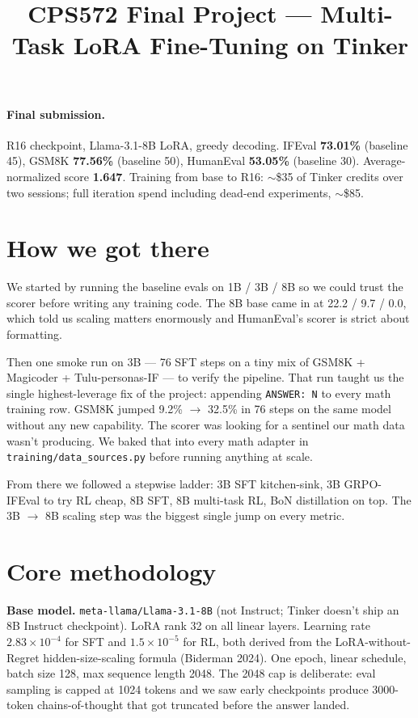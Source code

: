 \documentclass[11pt]{article}
\title{\vspace{-2em}CPS572 Final Project --- Multi-Task LoRA Fine-Tuning on Tinker}
\author{}
\date{}
\begin{document}
\maketitle
\vspace{-3em}

\paragraph{Final submission.} R16 checkpoint, Llama-3.1-8B LoRA, greedy decoding. IFEval \textbf{73.01\%} (baseline 45), GSM8K \textbf{77.56\%} (baseline 50), HumanEval \textbf{53.05\%} (baseline 30). Average-normalized score \textbf{1.647}. Training from base to R16: $\sim$\$35 of Tinker credits over two sessions; full iteration spend including dead-end experiments, $\sim$\$85.

\section{How we got there}

We started by running the baseline evals on 1B / 3B / 8B so we could trust the scorer before writing any training code. The 8B base came in at 22.2 / 9.7 / 0.0, which told us scaling matters enormously and HumanEval's scorer is strict about formatting.

Then one smoke run on 3B --- 76 SFT steps on a tiny mix of GSM8K + Magicoder + Tulu-personas-IF --- to verify the pipeline. That run taught us the single highest-leverage fix of the project: appending \texttt{ANSWER: N} to every math training row. GSM8K jumped 9.2\% $\rightarrow$ 32.5\% in 76 steps on the same model without any new capability. The scorer was looking for a sentinel our math data wasn't producing. We baked that into every math adapter in \texttt{training/data\_sources.py} before running anything at scale.

From there we followed a stepwise ladder: 3B SFT kitchen-sink, 3B GRPO-IFEval to try RL cheap, 8B SFT, 8B multi-task RL, BoN distillation on top. The 3B $\rightarrow$ 8B scaling step was the biggest single jump on every metric.

\section{Core methodology}

\textbf{Base model.} \texttt{meta-llama/Llama-3.1-8B} (not Instruct; Tinker doesn't ship an 8B Instruct checkpoint). LoRA rank 32 on all linear layers. Learning rate $2.83 \times 10^{-4}$ for SFT and $1.5 \times 10^{-5}$ for RL, both derived from the LoRA-without-Regret hidden-size-scaling formula (Biderman 2024). One epoch, linear schedule, batch size 128, max sequence length 2048. The 2048 cap is deliberate: eval sampling is capped at 1024 tokens and we saw early checkpoints produce 3000-token chains-of-thought that got truncated before the answer landed.
\end{document}

